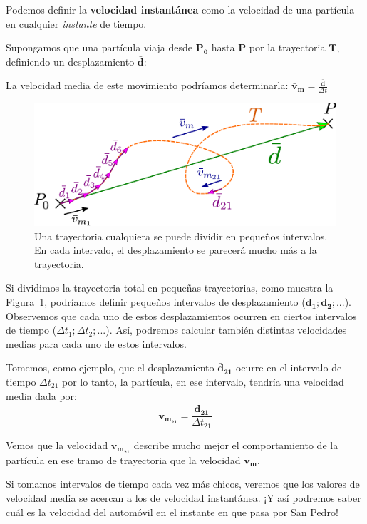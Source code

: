 Podemos definir la {\bf velocidad instantánea} como la velocidad de una partícula en cualquier {\it instante} de tiempo.

Supongamos que una partícula viaja desde {$\mathbold{P_0}$} hasta {$\mathbold{P}$} por la trayectoria {$\mathbold{T}$}, definiendo un desplazamiento {$\mathbold{\bar{d}}$}:

La velocidad media de este movimiento podríamos determinarla: $\mathbold{\bar{v}_m}=\frac{\mathbold{\bar{d}}}{\Delta t}$

\begin{figure}[!h]
\centering
 \includegraphics[width=.6\textwidth]{img/velocidad_instantanea.pdf}
 \caption{\label{fig:particion_tray} Una trayectoria cualquiera se puede dividir en pequeños intervalos. En cada intervalo, el desplazamiento se parecerá mucho más a la trayectoria.}
\end{figure}


Si dividimos la trayectoria total en pequeñas trayectorias, como muestra la Figura~\ref{fig:particion_tray}, podríamos definir pequeños intervalos de desplazamiento ({$\mathbold{\bar{d}_1; \bar{d}_2;...}$}). Observemos que cada uno de estos desplazamientos ocurren en ciertos intervalos de tiempo ({$\Delta t_1; \Delta t_2;...$}). Así, podremos calcular también distintas velocidades medias para cada uno de estos intervalos. 

Tomemos, como ejemplo, que el desplazamiento {$\mathbold{\bar{d}_{21}}$} ocurre en el intervalo de tiempo {$\Delta t_{21}$} por lo tanto, la partícula, en ese intervalo, tendría una velocidad media dada por: $$\mathbold{\bar{v}_{m_{21}}} = \frac{\mathbold{\bar{d}_{21}}}{\Delta t_{21}}$$

Vemos que la velocidad $\mathbold{\bar{v}_{m_{21}}}$ describe mucho mejor el comportamiento de la partícula en ese tramo de trayectoria que la velocidad $\mathbold{\bar{v}_m}$.

Si tomamos intervalos de tiempo cada vez más chicos, veremos que los valores de velocidad media se acercan a los de velocidad instantánea. ¡Y así podremos saber cuál es la velocidad del automóvil en el instante en que pasa por San Pedro!

